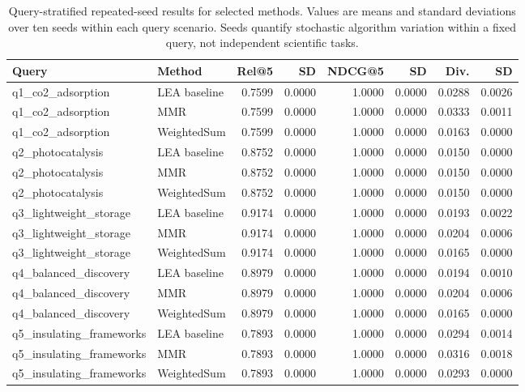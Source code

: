 \documentclass[12pt,a4paper]{article}
\begin{document}
\begin{table}[H]
\centering
\caption{Query-stratified repeated-seed results for selected methods. Values are means and standard deviations over ten seeds within each query scenario. Seeds quantify stochastic algorithm variation within a fixed query, not independent scientific tasks.}
\scriptsize
\setlength{\tabcolsep}{3pt}
\begin{tabular}{llrrrrrr}
\toprule
\textbf{Query} & \textbf{Method} & \textbf{Rel@5} & \textbf{SD} & \textbf{NDCG@5} & \textbf{SD} & \textbf{Div.} & \textbf{SD}\\
\midrule
q1\_co2\_adsorption & LEA baseline & 0.7599 & 0.0000 & 1.0000 & 0.0000 & 0.0288 & 0.0026\\
q1\_co2\_adsorption & MMR & 0.7599 & 0.0000 & 1.0000 & 0.0000 & 0.0333 & 0.0011\\
q1\_co2\_adsorption & WeightedSum & 0.7599 & 0.0000 & 1.0000 & 0.0000 & 0.0163 & 0.0000\\
q2\_photocatalysis & LEA baseline & 0.8752 & 0.0000 & 1.0000 & 0.0000 & 0.0150 & 0.0000\\
q2\_photocatalysis & MMR & 0.8752 & 0.0000 & 1.0000 & 0.0000 & 0.0150 & 0.0000\\
q2\_photocatalysis & WeightedSum & 0.8752 & 0.0000 & 1.0000 & 0.0000 & 0.0150 & 0.0000\\
q3\_lightweight\_storage & LEA baseline & 0.9174 & 0.0000 & 1.0000 & 0.0000 & 0.0193 & 0.0022\\
q3\_lightweight\_storage & MMR & 0.9174 & 0.0000 & 1.0000 & 0.0000 & 0.0204 & 0.0006\\
q3\_lightweight\_storage & WeightedSum & 0.9174 & 0.0000 & 1.0000 & 0.0000 & 0.0165 & 0.0000\\
q4\_balanced\_discovery & LEA baseline & 0.8979 & 0.0000 & 1.0000 & 0.0000 & 0.0194 & 0.0010\\
q4\_balanced\_discovery & MMR & 0.8979 & 0.0000 & 1.0000 & 0.0000 & 0.0204 & 0.0006\\
q4\_balanced\_discovery & WeightedSum & 0.8979 & 0.0000 & 1.0000 & 0.0000 & 0.0165 & 0.0000\\
q5\_insulating\_frameworks & LEA baseline & 0.7893 & 0.0000 & 1.0000 & 0.0000 & 0.0294 & 0.0014\\
q5\_insulating\_frameworks & MMR & 0.7893 & 0.0000 & 1.0000 & 0.0000 & 0.0316 & 0.0018\\
q5\_insulating\_frameworks & WeightedSum & 0.7893 & 0.0000 & 1.0000 & 0.0000 & 0.0293 & 0.0000\\
\bottomrule
\end{tabular}
\end{table}
\end{document}
